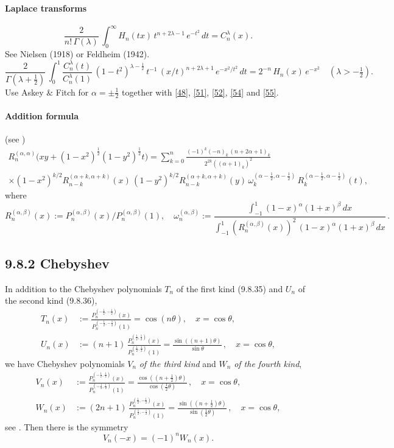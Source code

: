 \documentclass[twoside,11pt]{article}
\newcommand\al\alpha
\newcommand\be\beta
\newcommand\tha\theta
\newcommand\la\lambda
\newcommand\om\omega
\newcommand\Ga{\Gamma}
\newcommand\half{\frac12}
\newcommand\thalf{\tfrac12}
\newcommand\iy\infty
\begin{document}
\paragraph{Laplace transforms}
\begin{equation}
\frac2{n!\,\Ga(\la)}\,
\int_0^\iy H_n(tx)\,t^{n+2\la-1}\,e^{-t^2}\,dt=C_n^\la(x).
\label{56}
\end{equation}
See Nielsen \cite[p.48, (4) with p.47, (1) and p.28, (10)]{K4} (1918)
or Feldheim \cite[(28)]{K3} (1942).
\begin{equation}
\frac2{\Ga(\la+\thalf)}\,\int_0^1 \frac{C_n^\la(t)}{C_n^\la(1)}\,
(1-t^2)^{\la-\half}\,t^{-1}\,(x/t)^{n+2\la+1}\,e^{-x^2/t^2}\,dt
=2^{-n}\,H_n(x)\,e^{-x^2}\quad(\la>-\thalf).
\label{46}
\end{equation}
Use Askey \& Fitch \cite[(3.29)]{K2} for $\al=\pm\thalf$ together with
\eqref{48}, \eqref{51}, \eqref{52}, \eqref{54} and \eqref{55}.
\paragraph{Addition formula} (see \mycite{AAR}{(9.8.5$'$)]})
\begin{multline}
R_n^{(\al,\al)}\big(xy+(1-x^2)^\half(1-y^2)^\half t\big)
=\sum_{k=0}^n \frac{(-1)^k(-n)_k\,(n+2\al+1)_k}{2^{2k}((\al+1)_k)^2}\\
\times(1-x^2)^{k/2} R_{n-k}^{(\al+k,\al+k)}(x)\,(1-y^2)^{k/2} R_{n-k}^{(\al+k,\al+k)}(y)\,
\om_k^{(\al-\half,\al-\half)}\,R_k^{(\al-\half,\al-\half)}(t),
\label{108}
\end{multline}
where
\[
R_n^{(\al,\be)}(x):=P_n^{(\al,\be)}(x)/P_n^{(\al,\be)}(1),\quad
\om_n^{(\al,\be)}:=\frac{\int_{-1}^1 (1-x)^\al(1+x)^\be\,dx}
{\int_{-1}^1 (R_n^{(\al,\be)}(x))^2\,(1-x)^\al(1+x)^\be\,dx}\,.
\]
%
\subsection*{9.8.2 Chebyshev}
\label{sec9.8.2}
In addition to the Chebyshev polynomials $T_n$ of the first kind (9.8.35)
and $U_n$ of the second kind (9.8.36),
\begin{align}
T_n(x)&:=\frac{P_n^{(-\half,-\half)}(x)}{P_n^{(-\half,-\half)}(1)}
=\cos(n\tha),\quad x=\cos\tha,\\
U_n(x)&:=(n+1)\,\frac{P_n^{(\half,\half)}(x)}{P_n^{(\half,\half)}(1)}
=\frac{\sin((n+1)\tha)}{\sin\tha}\,,\quad x=\cos\tha,
\end{align}
we have Chebyshev polynomials $V_n$ {\em of the third kind}
and $W_n$ {\em of the fourth kind},
\begin{align}
V_n(x)&:=\frac{P_n^{(-\half,\half)}(x)}{P_n^{(-\half,\half)}(1)}
=\frac{\cos((n+\thalf)\tha)}{\cos(\thalf\tha)}\,,\quad x=\cos\tha,\\
W_n(x)&:=(2n+1)\,\frac{P_n^{(\half,-\half)}(x)}{P_n^{(\half,-\half)}(1)}
=\frac{\sin((n+\thalf)\tha)}{\sin(\thalf\tha)}\,,\quad x=\cos\tha,
\end{align}
see \cite[Section 1.2.3]{K20}. Then there is the symmetry
\begin{equation}
V_n(-x)=(-1)^n W_n(x).
\label{140}
\end{equation}
\end{document}
